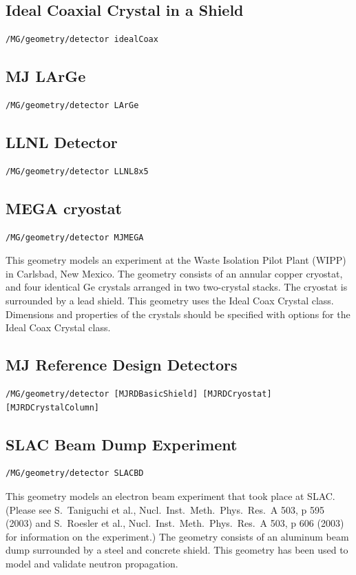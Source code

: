 \subsection{Ideal Coaxial Crystal in a Shield}
\begin{lstlisting}
/MG/geometry/detector idealCoax
\end{lstlisting}

\subsection{MJ LArGe}
\begin{lstlisting}
/MG/geometry/detector LArGe
\end{lstlisting}

\subsection{LLNL Detector}
\begin{lstlisting}
/MG/geometry/detector LLNL8x5
\end{lstlisting}

\subsection{MEGA cryostat}
\begin{lstlisting}
/MG/geometry/detector MJMEGA
\end{lstlisting}
This geometry models an experiment at the Waste Isolation Pilot Plant (WIPP) in
Carlsbad, New Mexico.  The geometry consists of an annular copper cryostat, 
and four identical Ge crystals arranged in two two-crystal stacks.  The 
cryostat is surrounded by a lead shield.  This geometry uses the Ideal Coax Crystal class.  Dimensions and properties of the crystals should be specified with 
options for the Ideal Coax Crystal class.

\subsection{MJ Reference Design Detectors}
\begin{lstlisting}
/MG/geometry/detector [MJRDBasicShield] [MJRDCryostat] [MJRDCrystalColumn]
\end{lstlisting}

\subsection{SLAC Beam Dump Experiment}
\begin{lstlisting}
/MG/geometry/detector SLACBD
\end{lstlisting}
This geometry models an electron beam experiment that took place at SLAC.  (Please
see S.~Taniguchi et al., Nucl.~Inst.~Meth.~Phys.~Res.~A 503, p 595 (2003) and 
S.~Roesler et al., Nucl.~Inst.~Meth.~Phys.~Res.~A 503, p 606 (2003) for information 
on the experiment.) The geometry consists of an aluminum beam dump surrounded by a steel and concrete shield.  
This geometry has been used to model and validate neutron propagation.
